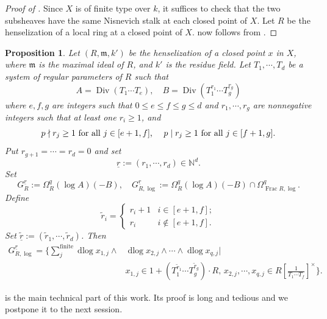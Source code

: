 \documentclass[11pt]{amsart}
\newcommand{\N}{\mathbb{N}}
\newcommand{\ssm}{\mathfrak{m}}
\newcommand{\Frac}{\operatorname{Frac}}
\newcommand{\Div}{\operatorname{Div}}
\newcommand{\dlog}{\operatorname{dlog}}
\newcommand{\ul}{\underline}
\renewcommand{\tilde}{\widetilde}
\theoremstyle{plain}
\newtheorem{prop}{Proposition}[section]
\theoremstyle{definition}
\numberwithin{equation}{prop}
\begin{document}
\begin{proof}[{Proof of }]
Since $X$ is of finite type over $k$, it suffices to check that the two subsheaves have the same Nisnevich stalk at each closed point of $X$.
Let $R$ be the henselization of a local ring at a closed point of $X$.
 now follows from .
\end{proof}


\begin{prop}
\label{MainProp}
Let $(R,\ssm,k')$ be the henselization of a closed point $x$ in $X$, where $\ssm$ is the maximal ideal of $R$, and $k'$ is the residue field.
Let $T_1,\cdots , T_d$ be a system of regular parameters of $R$ such that 
$$A=\Div(T_1\cdots T_e), \quad
B=\Div(T_1^{r_1}\cdots   T_g^{r_g})$$
where $e,f,g$ are integers such that $0\le e\le f \le g\le d$  and $r_1,\cdots, r_g$ are nonnegative integers such that at least one $r_i\ge 1$, and
$$\text{$p\nmid r_j\ge 1$ for all $j\in [e+1,f]$,
\quad 
$p\mid r_j\ge 1$ for all $j\in [f+1,g]$.}$$
Put 
$r_{g+1}=\cdots =r_{d}=0$ and set
$$\ul r:=(r_1,\cdots, r_d)\in \N^d.$$
Set
$$G_{R}^{\ul r}:=
\Omega^q_R(\log A)(-B),\quad
G_{R,\log}^{\ul r}:=
\Omega^q_R(\log A)(-B)
\cap
\Omega^q_{\Frac R,\log}.$$
Define
$$\tilde r_i=
\begin{cases}
    r_i+1& i\in[e+1,f];
    \\
    r_i& i\notin [e+1,f].
\end{cases}$$
Set $\tilde{\underline{r}}:=(\tilde r_1,\cdots,\tilde r_d)$.
Then 
\begin{align}
\label{MainPropeq0}
G_{R,\log}^{\ul r}=
\Big\{
\sum_j^{\text{finite}}\dlog x_{1,j}\wedge &\dlog x_{2,j}\wedge\cdots \wedge\dlog x_{q,j}
\Big|
\\
&x_{1,j}\in 
1+(T_1^{\tilde r_1}\cdots  T_g^{\tilde r_g})\cdot R,\,
x_{2,j},\cdots,x_{q,j} \in R[\frac{1}{T_1\cdots T_f}]^\times
\Big\}.
\nonumber
\end{align}
\end{prop}
 is the main technical part of this work. Its proof is long and tedious and we postpone it to the next session. 
\end{document}
